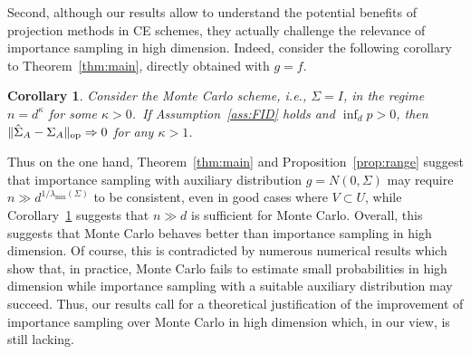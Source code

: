 \documentclass[]{article}
\newcommand{\op}{{\rm op}}
\theoremstyle{plain}
\newtheorem{corollary}[lemma]{Corollary}
\theoremstyle{definition}
\begin{document}
Second, although our results allow to understand the potential benefits of projection methods in CE schemes, they actually challenge the relevance of importance sampling in high dimension. Indeed, consider the following corollary to Theorem~\ref{thm:main}, directly obtained with $g = f$.
% 
\begin{corollary} \label{cor:monte-carlo}
	Consider the Monte Carlo scheme, i.e., $\Sigma = I$, in the regime $n = d^\kappa$ for some $\kappa > 0$. If Assumption~\ref{ass:FID} holds and $\inf_d p > 0$, then $\lVert \hat \Sigma_A - \Sigma_A \rVert_\op \Rightarrow 0$ for any $\kappa > 1$.
\end{corollary}
% 
\noindent Thus on the one hand, Theorem~\ref{thm:main} and Proposition~\ref{prop:range} suggest that importance sampling with auxiliary distribution $g = N(0, \Sigma)$ may require $n \gg d^{1/\lambda_{\min}(\Sigma)}$ to be consistent, even in good cases where $V \subset U$, while Corollary~\ref{cor:monte-carlo} suggests that $n \gg d$ is sufficient for Monte Carlo. Overall, this suggests that Monte Carlo behaves better than importance sampling in high dimension. Of course, this is contradicted by numerous numerical results which show that, in practice, Monte Carlo fails to estimate small probabilities in high dimension while importance sampling with a suitable auxiliary distribution may succeed. Thus, our results call for a theoretical justification of the improvement of importance sampling over Monte Carlo in high dimension which, in our view, is still lacking.
\end{document}
